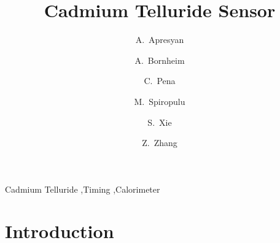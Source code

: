 \documentclass[preprint,1p]{elsarticle}
\begin{document}
\linenumbers

\begin{frontmatter}



\title{Cadmium Telluride Sensor}


\author[2]{A.~Apresyan}
\author[1]{A.~Bornheim}
\author[1]{C.~Pena}
\author[1]{M.~Spiropulu}
\author[1]{S.~Xie}
\author[1]{Z.~Zhang}
\address[1]{California Institute of Technology, Pasadena, CA, USA}
\address[2]{Fermi National Accelerator Laboratory, Batavia, IL, USA}

\begin{abstract}


\end{abstract}

\begin{keyword}

Cadmium Telluride \sep Timing \sep Calorimeter

\end{keyword}

\end{frontmatter}


\section{Introduction} 
\end{document}
